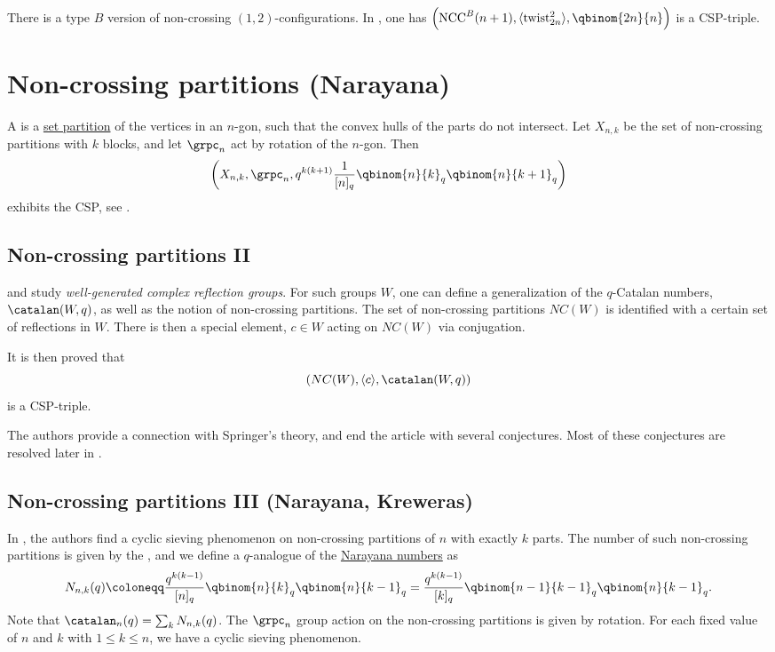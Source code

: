 There is a type $B$ version of non-crossing $(1,2)$-configurations.
In \cite[Thm.~6.6]{AlexanderssonLinussonPotkaUhlin2021}, one has
$
\left(\mathrm{NCC}^B(n+1), \langle \mathrm{twist}^2_{2n} \rangle,
\qbinom{2n}{n}\right)
$
is a CSP-triple.


\section[cspNonCrossingPartitions]{Non-crossing partitions (Narayana)}

A \label{nonCrossingPartitionCSP} is a
\hyperref[setPartitions]{set partition} of the vertices in an $n$-gon, such
that the convex hulls of the parts do not intersect.
Let $X_{n,k}$ be the set of non-crossing partitions with $k$ blocks,
and let $\grpc_n$ act by rotation of the $n$-gon.
Then
\[
\left( X_{n,k}, \grpc_n,
q^{k(k+1)} \frac{1}{[n]_q} \qbinom{n}{k}_q \qbinom{n}{k+1}_q
\right)
\]
exhibits the CSP, see \cite{ReinerStantonWhite2004}.


\subsection[cspWCatalan]{Non-crossing partitions II}

 and  \cite{BessisReiner2011} study
\emph{well-generated complex reflection groups}.
For such groups $W$, one can define a generalization of the $q$-Catalan
numbers, $\catalan(W,q)$,
as well as the notion of non-crossing partitions.
The set of non-crossing partitions $NC(W)$ is identified with a certain set of
reflections in $W$.
There is then a special element, $c\in W$ acting on $NC(W)$ via conjugation.

It is then proved that
\[
\left(
NC(W), \langle c \rangle , \catalan(W,q)
\right)
\]
is a CSP-triple.

The authors provide a connection with Springer's theory, and end the article
with several conjectures.  Most of these conjectures are resolved later in
\cite{ReinerSommers2018}.


\subsection[cspNarayana]{Non-crossing partitions III (Narayana, Kreweras)}

In \cite{ReinerSommers2018}, the authors find a cyclic sieving phenomenon
on non-crossing partitions of $n$ with exactly $k$ parts.
The number of such non-crossing partitions is given by the
\label{narayanaNumberCSP}, and we define a
$q$-analogue of the \hyperref[prelimQanalogsCatalan]{Narayana numbers} as
\[
N_{n,k}(q) \coloneqq \frac{ q^{k(k-1)} }{ [n]_q } \qbinom{n}{k}_q \qbinom{n}{k-1}_q 
= \frac{ q^{k(k-1)} }{[k]_q} \qbinom{n-1}{k-1}_q \qbinom{n}{k-1}_q.
\]
Note that $\catalan_n(q)=\sum_k N_{n,k}(q)$.
The $\grpc_n$ group action on the non-crossing partitions is given by rotation.
For each fixed value of $n$ and $k$ with $1\leq k \leq n$,
we have a cyclic sieving phenomenon.


